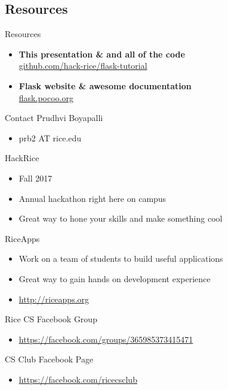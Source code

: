 \documentclass{beamer}
\begin{document}
\subsection{Resources}
	\begin{frame}[t]{Resources}
		\begin{itemize}
			\item{
				\textbf{This presentation \& and all of the code}\\
				\indent \url{github.com/hack-rice/flask-tutorial}
			}
			\item{
				\textbf{Flask website \& awesome documentation}\\
				\indent \url{flask.pocoo.org}
			}
		\end{itemize}
	\end{frame}

	\begin{frame}[t]{Contact}
		Prudhvi Boyapalli
		\begin{itemize}
			\item{prb2 AT rice.edu}
		\end{itemize}

		HackRice
		\begin{itemize}
			\item{Fall 2017}
			\item{Annual hackathon right here on campus}
			\item{Great way to hone your skills and make something cool}
		\end{itemize}

		RiceApps
		\begin{itemize}
			\item{Work on a team of students to build useful applications}
			\item{Great way to gain hands on development experience}
			\item{\url{http://riceapps.org}}
		\end{itemize}

		Rice CS Facebook Group
		\begin{itemize}
			\item{\url{https://facebook.com/groups/365985373415471}}
		\end{itemize}

		CS Club Facebook Page
		\begin{itemize}
			\item{\url{https://facebook.com/ricecsclub}}
		\end{itemize}
	\end{frame}
\end{document}
